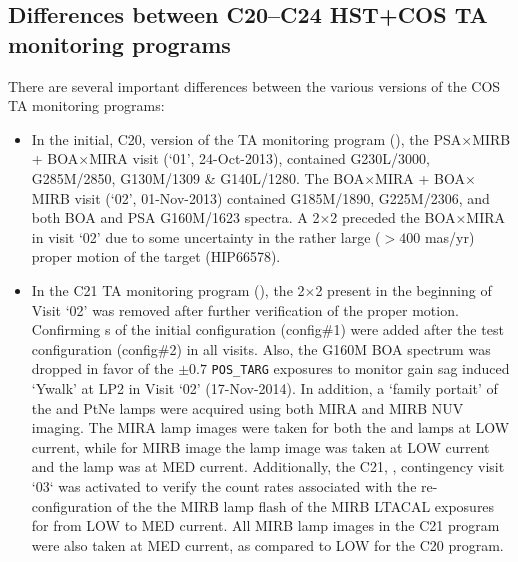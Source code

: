 \subsection{Differences between C20--C24 HST+COS TA monitoring programs}\label{subsec:differences}

There are several important differences between the various versions of the COS TA monitoring programs:

\begin{itemize}
\item{
In the initial, C20, version of the TA monitoring program (),
the PSA$\times$MIRB + BOA$\times$MIRA  visit (`01', 24-Oct-2013), contained G230L/3000, G285M/2850, G130M/1309 \& G140L/1280.
The BOA$\times$MIRA + BOA$\times$MIRB  visit (`02', 01-Nov-2013) contained G185M/1890, G225M/2306, and both BOA and PSA G160M/1623 spectra.
A 2$\times$2  preceded the BOA$\times$MIRA  in visit `02' due to some uncertainty in the rather large ($> 400$ mas/yr) proper motion of the target (HIP66578).
}
\item{
In the C21 TA monitoring program (), the 2$\times$2  present in the beginning of Visit `02' was removed after further verification of the proper motion.
Confirming s of the initial configuration (config\#1) were added after the test configuration (config\#2) in all visits.
Also, the G160M BOA spectrum was dropped in favor of the $\pm 0.7$\arcsec{} \texttt{POS\_TARG} exposures to monitor gain sag induced `Ywalk' at LP2 in Visit `02' (17-Nov-2014).
In addition, a `family portait' of the \plampone{} and \plamptwo{} PtNe lamps were acquired using both MIRA and MIRB NUV imaging.
The MIRA lamp images were taken for both the \plampone{} and \plamptwo{} lamps at LOW current, while for MIRB image the \plampone{} lamp image was taken at LOW current and the \plamptwo{} lamp was at MED current.
Additionally, the C21, , contingency visit `03` was activated to verify the count rates associated with the re-configuration of the
the MIRB  lamp flash of the MIRB \textsc{LTACAL} exposures for \plamptwo{} from LOW to MED current.
All MIRB lamp images in the C21 program were also taken at MED current, as  compared to LOW for the C20 program.

}
\end{itemize}
